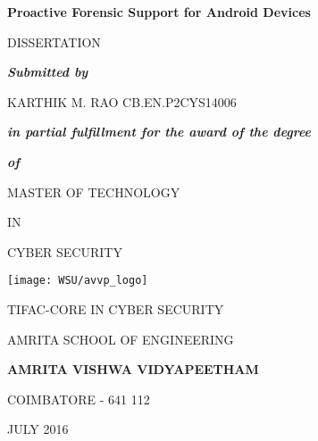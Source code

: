 

 
\begin{center}
\Large
\textbf{Proactive Forensic Support for Android Devices}

\vspace*{32pt}
\normalsize
DISSERTATION

\vspace*{32pt}
\textbf{\textit{Submitted by}}

\vspace*{32pt}
\begin{flushleft}
 \hspace*{100pt}
 \large  
KARTHIK M. RAO
 \hspace*{2pt}
 \large
CB.EN.P2CYS14006
\end{flushleft}

\vspace*{32pt}
\normalsize
\textit{\textbf{in partial fulfillment for the award of the degree}}

\textbf{\textit{of}}

\vspace*{32pt}
MASTER OF TECHNOLOGY

IN

CYBER SECURITY

\vspace*{32pt}
\texttt{[image: WSU/avvp\_logo]}

\vspace*{20pt}
\normalsize
TIFAC-CORE IN CYBER SECURITY

\vspace*{5pt}
AMRITA SCHOOL OF ENGINEERING

\vspace*{5pt}
\large
\textbf{AMRITA VISHWA VIDYAPEETHAM}

\vspace*{5pt}
\normalsize
COIMBATORE - 641 112

\vspace*{10pt}
JULY 2016
\end{center}
 


\clearpage




 
